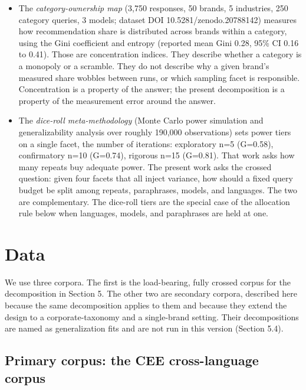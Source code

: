 \documentclass[pdflatex,sn-mathphys-num]{sn-jnl}
\begin{document}
\begin{itemize}
\item
  The \emph{category-ownership map} \cite{ref18} (3,750 responses, 50 brands, 5 industries, 250 category queries, 3 models; dataset DOI 10.5281/zenodo.20788142) measures how recommendation share is distributed across brands within a category, using the Gini coefficient and entropy (reported mean Gini 0.28, 95\% CI 0.16 to 0.41). Those are concentration indices. They describe whether a category is a monopoly or a scramble. They do not describe why a given brand's measured share wobbles between runs, or which sampling facet is responsible. Concentration is a property of the answer; the present decomposition is a property of the measurement error around the answer.
\item
  The \emph{dice-roll meta-methodology} \cite{ref19} (Monte Carlo power simulation and generalizability analysis over roughly 190,000 observations) sets power tiers on a single facet, the number of iterations: exploratory n=5 (G=0.58), confirmatory n=10 (G=0.74), rigorous n=15 (G=0.81). That work asks how many repeats buy adequate power. The present work asks the crossed question: given four facets that all inject variance, how should a fixed query budget be split among repeats, paraphrases, models, and languages. The two are complementary. The dice-roll tiers are the special case of the allocation rule below when languages, models, and paraphrases are held at one.
\end{itemize}

\section{Data}\label{data}

We use three corpora. The first is the load-bearing, fully crossed corpus for the decomposition in Section 5. The other two are secondary corpora, described here because the same decomposition applies to them and because they extend the design to a corporate-taxonomy and a single-brand setting. Their decompositions are named as generalization fits and are not run in this version (Section 5.4).

\subsection{Primary corpus: the CEE cross-language corpus}\label{primary-corpus-the-cee-cross-language-corpus}
\end{document}
